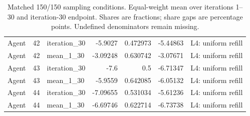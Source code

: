 \begin{table}[htbp!]
\begin{tabular}{lrlrrrl}
Agent & 42 & iteration\_30 & -5.9027 & 0.472973 & -5.44863 & L4: uniform refill \\
Agent & 42 & mean\_1\_30 & -3.09248 & 0.630742 & -3.07671 & L4: uniform refill \\
Agent & 43 & iteration\_30 & -7.6 & 0.5 & -6.71347 & L4: uniform refill \\
Agent & 43 & mean\_1\_30 & -5.9559 & 0.642085 & -6.05132 & L4: uniform refill \\
Agent & 44 & iteration\_30 & -7.09655 & 0.531034 & -5.61236 & L4: uniform refill \\
Agent & 44 & mean\_1\_30 & -6.69746 & 0.622714 & -6.73738 & L4: uniform refill \\
\hline
\end{tabular}
\caption{Matched 150/150 sampling conditions. Equal-weight mean over iterations 1--30 and iteration-30 endpoint. Shares are fractions; share gaps are percentage points. Undefined denominators remain missing.}
\label{chap:results:tab:rq1_sampling_click_exposure}
\end{table}
